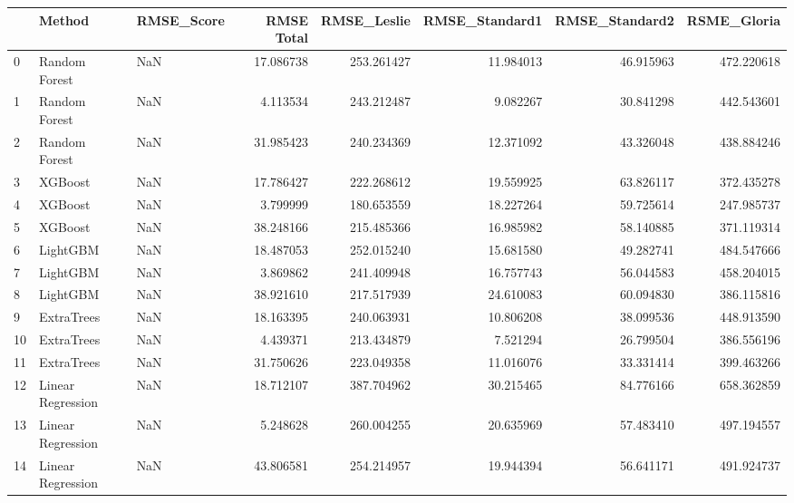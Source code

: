 \begin{tabular}{lllrrrrr}
\toprule
{} &             Method & RMSE\_Score &  RMSE Total &  RMSE\_Leslie &  RMSE\_Standard1 &  RMSE\_Standard2 &  RSME\_Gloria \\
\midrule
0  &      Random Forest &        NaN &   17.086738 &   253.261427 &       11.984013 &       46.915963 &   472.220618 \\
1  &      Random Forest &        NaN &    4.113534 &   243.212487 &        9.082267 &       30.841298 &   442.543601 \\
2  &      Random Forest &        NaN &   31.985423 &   240.234369 &       12.371092 &       43.326048 &   438.884246 \\
3  &            XGBoost &        NaN &   17.786427 &   222.268612 &       19.559925 &       63.826117 &   372.435278 \\
4  &            XGBoost &        NaN &    3.799999 &   180.653559 &       18.227264 &       59.725614 &   247.985737 \\
5  &            XGBoost &        NaN &   38.248166 &   215.485366 &       16.985982 &       58.140885 &   371.119314 \\
6  &           LightGBM &        NaN &   18.487053 &   252.015240 &       15.681580 &       49.282741 &   484.547666 \\
7  &           LightGBM &        NaN &    3.869862 &   241.409948 &       16.757743 &       56.044583 &   458.204015 \\
8  &           LightGBM &        NaN &   38.921610 &   217.517939 &       24.610083 &       60.094830 &   386.115816 \\
9  &         ExtraTrees &        NaN &   18.163395 &   240.063931 &       10.806208 &       38.099536 &   448.913590 \\
10 &         ExtraTrees &        NaN &    4.439371 &   213.434879 &        7.521294 &       26.799504 &   386.556196 \\
11 &         ExtraTrees &        NaN &   31.750626 &   223.049358 &       11.016076 &       33.331414 &   399.463266 \\
12 &  Linear Regression &        NaN &   18.712107 &   387.704962 &       30.215465 &       84.776166 &   658.362859 \\
13 &  Linear Regression &        NaN &    5.248628 &   260.004255 &       20.635969 &       57.483410 &   497.194557 \\
14 &  Linear Regression &        NaN &   43.806581 &   254.214957 &       19.944394 &       56.641171 &   491.924737 \\
\bottomrule
\end{tabular}
